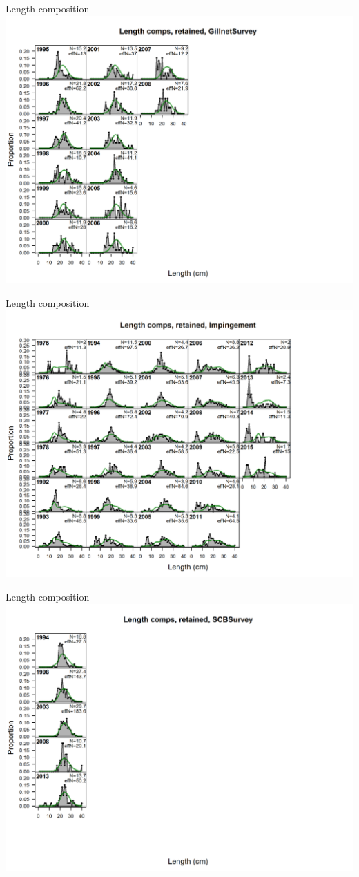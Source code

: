 \documentclass[ignorenonframetext,compress]{beamer}
\begin{document}
\begin{frame}{Length composition}\includegraphics{./r4ss/plots_mod1/comp_lenfit_flt9mkt2.png}\end{frame}

\begin{frame}{Length composition}\includegraphics{./r4ss/plots_mod1/comp_lenfit_flt10mkt2.png}\end{frame}

\begin{frame}{Length composition}\includegraphics{./r4ss/plots_mod1/comp_lenfit_flt11mkt2.png}\end{frame}
\end{document}
